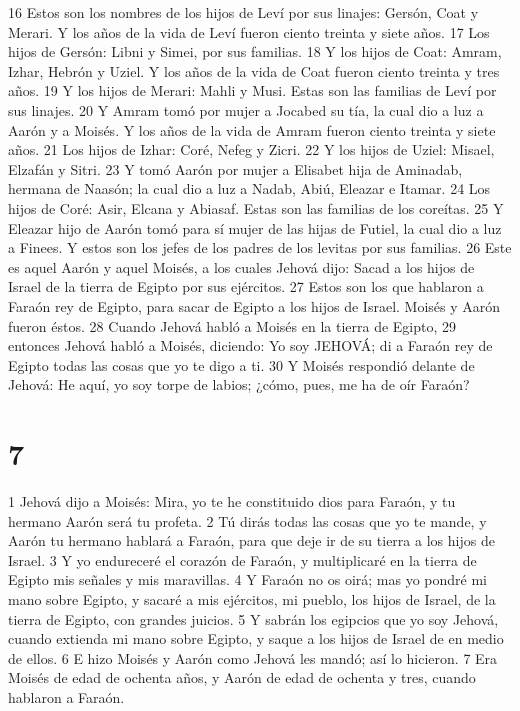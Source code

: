 16 Estos son los nombres de los hijos de Leví por sus linajes: Gersón, Coat y Merari. Y los años de la vida de Leví fueron ciento treinta y siete años.
17 Los hijos de Gersón: Libni y Simei, por sus familias.
18 Y los hijos de Coat: Amram, Izhar, Hebrón y Uziel. Y los años de la vida de Coat fueron ciento treinta y tres años.
19 Y los hijos de Merari: Mahli y Musi. Estas son las familias de Leví por sus linajes.
20 Y Amram tomó por mujer a Jocabed su tía, la cual dio a luz a Aarón y a Moisés. Y los años de la vida de Amram fueron ciento treinta y siete años.
21 Los hijos de Izhar: Coré, Nefeg y Zicri.
22 Y los hijos de Uziel: Misael, Elzafán y Sitri.
23 Y tomó Aarón por mujer a Elisabet hija de Aminadab, hermana de Naasón; la cual dio a luz a Nadab, Abiú, Eleazar e Itamar.
24 Los hijos de Coré: Asir, Elcana y Abiasaf. Estas son las familias de los coreítas.
25 Y Eleazar hijo de Aarón tomó para sí mujer de las hijas de Futiel, la cual dio a luz a Finees. Y estos son los jefes de los padres de los levitas por sus familias.
26 Este es aquel Aarón y aquel Moisés, a los cuales Jehová dijo: Sacad a los hijos de Israel de la tierra de Egipto por sus ejércitos.
27 Estos son los que hablaron a Faraón rey de Egipto, para sacar de Egipto a los hijos de Israel. Moisés y Aarón fueron éstos.
28 Cuando Jehová habló a Moisés en la tierra de Egipto,
29 entonces Jehová habló a Moisés, diciendo: Yo soy JEHOVÁ; di a Faraón rey de Egipto todas las cosas que yo te digo a ti.
30 Y Moisés respondió delante de Jehová: He aquí, yo soy torpe de labios; ¿cómo, pues, me ha de oír Faraón?

\chapter{7}

1 Jehová dijo a Moisés: Mira, yo te he constituido dios para Faraón, y tu hermano Aarón será tu profeta.
2 Tú dirás todas las cosas que yo te mande, y Aarón tu hermano hablará a Faraón, para que deje ir de su tierra a los hijos de Israel.
3 Y yo endureceré el corazón de Faraón, y multiplicaré en la tierra de Egipto mis señales y mis maravillas.
4 Y Faraón no os oirá; mas yo pondré mi mano sobre Egipto, y sacaré a mis ejércitos, mi pueblo, los hijos de Israel, de la tierra de Egipto, con grandes juicios.
5 Y sabrán los egipcios que yo soy Jehová, cuando extienda mi mano sobre Egipto, y saque a los hijos de Israel de en medio de ellos.
6 E hizo Moisés y Aarón como Jehová les mandó; así lo hicieron.
7 Era Moisés de edad de ochenta años, y Aarón de edad de ochenta y tres, cuando hablaron a Faraón.

